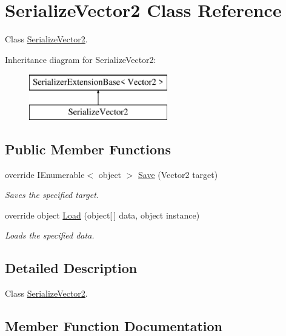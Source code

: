 \hypertarget{class_serialize_vector2}{}\section{Serialize\+Vector2 Class Reference}
\label{class_serialize_vector2}


Class \hyperlink{class_serialize_vector2}{Serialize\+Vector2}.  


Inheritance diagram for Serialize\+Vector2\+:\begin{figure}[H]
\begin{center}
\leavevmode
\includegraphics[height=2.000000cm]{class_serialize_vector2}
\end{center}
\end{figure}
\subsection*{Public Member Functions}
\begin{DoxyCompactItemize}
\item 
override I\+Enumerable$<$ object $>$ \hyperlink{class_serialize_vector2_afda6e3e96dc0d23c05983073104156cc}{Save} (Vector2 target)
\begin{DoxyCompactList}\small\item\em Saves the specified target. \end{DoxyCompactList}\item 
override object \hyperlink{class_serialize_vector2_aa4853c3ec1858d811025f696d6e992c5}{Load} (object\mbox{[}$\,$\mbox{]} data, object instance)
\begin{DoxyCompactList}\small\item\em Loads the specified data. \end{DoxyCompactList}\end{DoxyCompactItemize}


\subsection{Detailed Description}
Class \hyperlink{class_serialize_vector2}{Serialize\+Vector2}. 



\subsection{Member Function Documentation}
\mbox{\label{class_serialize_vector2_aa4853c3ec1858d811025f696d6e992c5}} 
